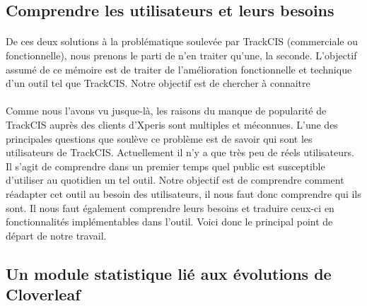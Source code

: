 		\subsection{Comprendre les utilisateurs et leurs besoins}
			\paragraph{}%
			De ces deux solutions à la problématique soulevée par TrackCIS (commerciale
			ou fonctionnelle), nous prenons le parti de n'en traiter qu'une, la
			seconde.\newline
			L'objectif assumé de ce mémoire est de traiter de l'amélioration
			fonctionnelle et technique d'un outil tel que TrackCIS. Notre objectif est de
			chercher à connaitre
			
			\paragraph{}%
			Comme nous l'avons vu jusque-là, les raisons du manque de
			popularité de TrackCIS auprès des clients d'Xperis sont multiples et
			méconnues. L'une des principales questions que soulève ce problème est de
			savoir qui sont les utilisateurs de TrackCIS. Actuellement il n'y a que très
			peu de réels utilisateurs. Il s'agit de comprendre dans un premier temps quel
			public est susceptible d'utiliser au quotidien un tel outil. Notre objectif
			est de comprendre comment réadapter cet outil au besoin des utilisateurs, il
			nous faut donc comprendre qui ils sont. Il nous faut également comprendre
			leurs besoins et traduire ceux-ci en fonctionnalités implémentables dans
			l'outil. Voici donc le principal point de départ de notre travail.
			
		\subsection{Un module statistique lié aux évolutions de Cloverleaf}
